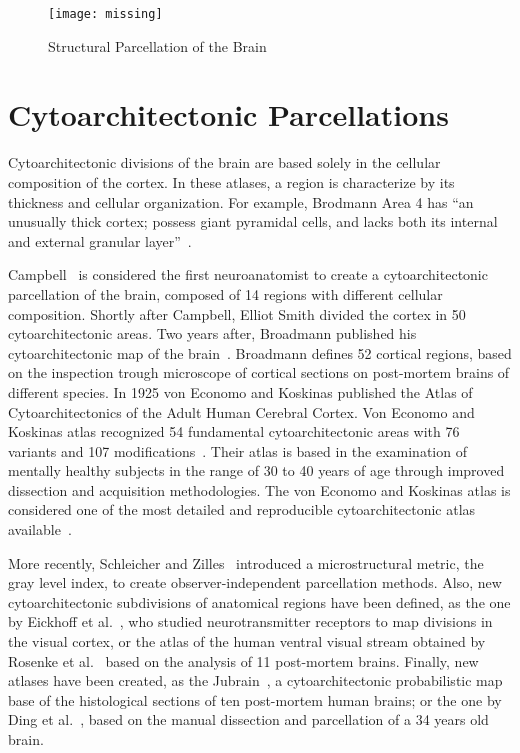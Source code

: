\begin{figure*}[t]
    \texttt{[image: missing]}
    \caption{Structural Parcellation of the Brain}
    \label{fig:brain_function}
\end{figure*}

\section{Cytoarchitectonic Parcellations}
\label{sec:cytoarchitecture}

Cytoarchitectonic divisions of the brain are based solely in the cellular
composition of the cortex. In these atlases, a region is characterize by its
thickness and cellular organization. For example, Brodmann Area 4 has
``an unusually thick cortex; possess giant pyramidal cells,
and lacks both its internal and external granular layer''~\cite{Brodmann1909}.

Campbell~\cite{Campbell1905} is considered the first neuroanatomist to create
a cytoarchitectonic parcellation of the brain, composed of 14 regions with
different cellular composition. Shortly after Campbell, Elliot Smith\cite{Smith1907}
divided the cortex in 50 cytoarchitectonic areas. Two years after, Broadmann
published his cytoarchitectonic map of the brain~\cite{Brodmann1909}. Broadmann
defines 52 cortical regions, based
on the inspection trough microscope of cortical sections on post-mortem
brains of different species. In 1925 von Economo and Koskinas published
the Atlas of Cytoarchitectonics of the Adult Human Cerebral Cortex\cite{VonEconomo1925}.
Von Economo and Koskinas atlas recognized 54 fundamental cytoarchitectonic areas with
76 variants and 107 modifications~\cite{Triarhou2007}. Their atlas is based in the
examination of mentally healthy subjects in the range of 30 to 40 years of age
through improved dissection and acquisition methodologies. The von Economo and 
Koskinas atlas is considered one of the most detailed and reproducible cytoarchitectonic
atlas available~\cite{Peden1947}.

More recently, Schleicher and Zilles~\cite{Schleicher1990} introduced a microstructural
metric, the gray level index, to create observer-independent parcellation methods.
Also, new cytoarchitectonic subdivisions of anatomical regions have been defined,
as the one by Eickhoff et al.~\cite{Eickhoff2008}, who studied neurotransmitter
receptors to map divisions in the visual cortex, or the atlas of the human
ventral visual stream obtained by Rosenke et al.~\cite{Rosenke2018} based on the
analysis of 11 post-mortem brains. Finally, new atlases have been created, as the 
Jubrain~\cite{Mohlberg2012}, a cytoarchitectonic probabilistic map base of the
histological sections of ten post-mortem human brains; or the one by
Ding et al.~\cite{Ding2016}, based on the manual dissection and parcellation
of a 34 years old brain.

